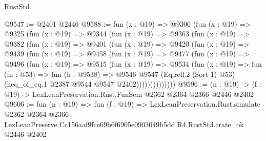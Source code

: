 \begin{lexlean}{RustStd}
\begin{coremodule}
@9547 := @2401 @2446
@9588 := fun (x : @19) =>
  @9306
    (fun (x : @19) =>
    @9325
      (fun (x : @19) =>
      @9344
        (fun (x : @19) =>
        @9363
          (fun (x : @19) =>
          @9382
            (fun (x : @19) =>
            @9401
              (fun (x : @19) =>
              @9420
                (fun (x : @19) =>
                @9439
                  (fun (x : @19) =>
                  @9458
                    (fun (x : @19) =>
                    @9477
                      (fun (x : @19) =>
                      @9496
                        (fun (x : @19) =>
                        @9515
                          (fun (x : @19) =>
                          @9534
                            (fun (x : @19) =>
                            fun (fn : @53) =>
                            fun (h : @9538) =>
                            @9546
                              @9547
                              (Eq.refl.{2} (Sort 1) @53)
                              (heq_of_eq.{1} @2387 @9544 @9547 @2402))))))))))))))
@9596 := (n : @19) -> (f : @19) -> LexLeanPreservation.Rust.FunSem @2362 @2364 @2366 @2446 @2402
@9606 := fun (n : @19) =>
  fun (f : @19) =>
  LexLeanPreservation.Rust.simulate
    @2362
    @2364
    @2366
    LexLeanPreserve.Cc156aaf9fce69b6f6905e0903049b5dd.R4.RustStd.crate_ok
    @2446
    @2402
\end{coremodule}
\end{lexlean}
